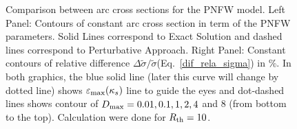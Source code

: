 \documentclass[useAMS,usenatbib]{mn2e}
\begin{document}
\begin{figure}
\begin{center}
\caption{\label{dcs_pnfw} Comparison between arc cross sections for the PNFW model. Left Panel: Contours of constant arc cross section in term of the PNFW parameters. Solid Lines correspond to Exact Solution and dashed lines correspond to Perturbative Approach.  Right Panel: Constant contours of  relative difference $\Delta\tilde{\sigma}/\tilde{\sigma}$(Eq.~\ref{dif_rela_sigma}) in \%. In both graphics, the blue solid line (later this curve will change by dotted line) shows $\varepsilon_{\rm max} (\kappa_s)$ line to guide the eyes and dot-dashed lines shows contour of $D_{\rm max}=0.01,0.1,1,2,4$ and $8$ (from bottom to the top). Calculation were done for $R_{\rm th}=10$. }
\end{center}
\end{figure}
\end{document}

